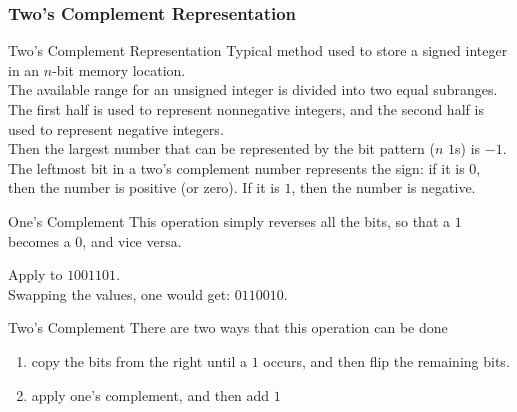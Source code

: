 \documentclass[../notes.tex]{subfiles}
\begin{document}
				\subsubsection{Two's Complement Representation}
					\begin{definition}{Two's Complement Representation}
						Typical method used to store a signed integer in an $n$-bit memory location.\\
						The available range for an unsigned integer is divided into two equal subranges. The first half is used to represent nonnegative integers, and the second half is used to represent negative integers.\\
						Then the largest number that can be represented by the bit pattern ($n$ $1$s) is $-1$.\\
						The leftmost bit in a two's complement number represents the sign: if it is $0$, then the number is positive (or zero). If it is $1$, then the number is negative.
					\end{definition}
					\begin{definition}{One's Complement}
						This operation simply reverses all the bits, so that a $1$ becomes a $0$, and vice versa.
					\end{definition}
					\begin{example}
						Apply  to $1001101$.\\
						Swapping the values, one would get: $0110010$.
					\end{example}
					\begin{definition}{Two's Complement}
						There are two ways that this operation can be done
						\begin{enumerate}
							\item copy the bits from the right until a $1$ occurs, and then flip the remaining bits.
							\item apply one's complement, and then add $1$
						\end{enumerate}
					\end{definition}
\end{document}
